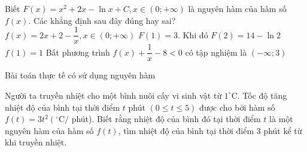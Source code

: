 \begin{ex} %
	Biết $F(x)=x^2+2x-\ln x+C,x\in \left(0;+\infty\right)$ là nguyên hàm của hàm số $f(x)$. Các khẳng định sau đây đúng hay sai?
	\choiceTF
	{\True $f(x)=2x+2-\dfrac{1}{x},x\in \left(0;+\infty\right)$}
	{$F(1)=3$. Khi đó $F(2)=14-\ln 2$}
	{$f(1)=1$}
	{Bất phương trình $f(x)+\dfrac{1}{x}-8<0$ có tập nghiệm là $\left(-\infty;3\right)$}
\end{ex}

\begin{dang}{Bài toán thực tế có sử dụng nguyên hàm}
\end{dang}
\setcounter{vd}{0}

\begin{vd}%
	Người ta truyền nhiệt cho một bình nuôi cấy vi sinh vật từ $1^{\circ} \mathrm{C}$. Tốc độ tăng nhiệt độ của bình tại thời điểm $t$ phút $(0 \leq t \leq 5)$ được cho bởi hàm số $f(t)=3 t^{2}\left( ^{\circ} \mathrm{C} /\right.$ phút). Biết rằng nhiệt độ của bình đó tại thời điểm $t$ là một nguyên hàm của hàm số $f(t)$, tìm nhiệt độ của bình tại thời điểm $3$ phút kể từ khi truyền nhiệt.
\end{vd}

